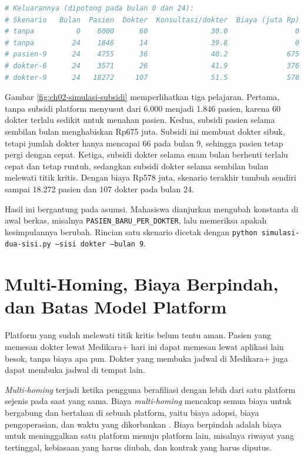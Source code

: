 \begin{pendalaman}[title={Pendalaman Teknis (opsional): Simulasi Pertumbuhan Dua Sisi}]
\begin{lstlisting}[language=bash, caption={Menjalankan empat skenario baku, memakai \berkas{sources/chapter02/simulasi-dua-sisi.py}}, label={lst:ch02-jalan-simulasi}]
# Keluarannya (dipotong pada bulan 0 dan 24):
# Skenario   Bulan  Pasien  Dokter  Konsultasi/dokter  Biaya (juta Rp)
# tanpa          0    6000      60               30.0                0
# tanpa         24    1846      14               39.8                0
# pasien-9      24    4755      36               40.2              675
# dokter-6      24    3571      26               41.9              376
# dokter-9      24   18272     107               51.5              578
\end{lstlisting}

\begin{center}
  
  \label{fig:ch02-simulasi-subsidi}
\end{center}

Gambar \ref{fig:ch02-simulasi-subsidi} memperlihatkan tiga pelajaran. Pertama,
tanpa subsidi platform menyusut dari 6.000 menjadi 1.846 pasien, karena 60
dokter terlalu sedikit untuk menahan pasien. Kedua, subsidi pasien selama
sembilan bulan menghabiskan Rp675 juta. Subsidi ini membuat dokter sibuk, tetapi
jumlah dokter hanya mencapai 66 pada bulan 9, sehingga pasien tetap pergi
dengan cepat. Ketiga, subsidi dokter selama enam bulan berhenti terlalu cepat
dan tetap runtuh, sedangkan subsidi dokter selama sembilan bulan melewati titik
kritis. Dengan biaya Rp578 juta, skenario terakhir tumbuh sendiri sampai 18.272
pasien dan 107 dokter pada bulan 24.

Hasil ini bergantung pada asumsi. Mahasiswa dianjurkan mengubah konstanta di
awal berkas, misalnya \texttt{PASIEN\_BARU\_PER\_DOKTER}, lalu memeriksa apakah
kesimpulannya berubah. Rincian satu skenario dicetak dengan
\texttt{python simulasi-dua-sisi.py --sisi dokter --bulan 9}.
\end{pendalaman}

\section{Multi-Homing, Biaya Berpindah, dan Batas Model Platform}

Platform yang sudah melewati titik kritis belum tentu aman. Pasien yang memesan
dokter lewat Medikara+ hari ini dapat memesan lewat aplikasi lain besok, tanpa
biaya apa pun. Dokter yang membuka jadwal di Medikara+ juga dapat membuka
jadwal di tempat lain.

\textit{Multi-homing} terjadi ketika pengguna berafiliasi dengan lebih dari satu
platform sejenis pada saat yang sama. Biaya \textit{multi-homing} mencakup
semua biaya untuk bergabung dan bertahan di sebuah platform, yaitu biaya adopsi,
biaya pengoperasian, dan waktu yang dikorbankan
\cite{eisenmann2006strategies}. Biaya berpindah adalah biaya untuk
meninggalkan satu platform menuju platform lain, misalnya riwayat yang
tertinggal, kebiasaan yang harus diubah, dan kontrak yang harus diputus.

